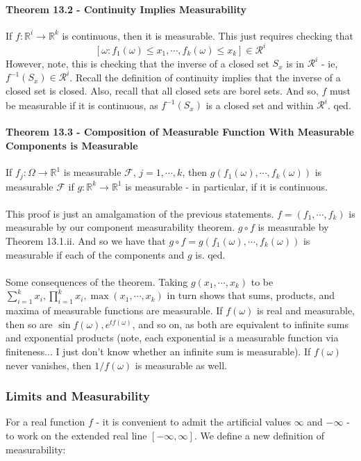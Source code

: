\documentclass[12pt,a4paper]{article}
\newcommand{\1}[1]{\mathbbm{1}\left\{ #1 \right\}}
\newcommand{\R}{\mathbb{R}}
\newcommand{\fcal}{\mathcal{F}}
\newcommand{\rcal}{\mathcal{R}}
\begin{document}
\paragraph{Theorem 13.2 - Continuity Implies Measurability} If $f: \R^i \to \R^k$ is continuous, then it is measurable. This just requires checking that
$$
	\left[\omega: f_1(\omega) \leq x_1, \cdots, f_k(\omega) \leq x_k\right] \in \rcal^i
$$
However, note, this is checking that the inverse of a closed set $S_x$ is in $\rcal^i$ - ie, $f^{-1}(S_x) \in \rcal^i$. Recall the definition of continuity implies that the inverse of a closed set is closed. Also, recall that all closed sets are borel sets. And so, $f$ must be measurable if it is continuous, as $f^{-1}(S_x)$ is a closed set and within $\rcal^i$. qed.

\paragraph{Theorem 13.3 - Composition of Measurable Function With Measurable Components is Measurable} If $f_j: \Omega \to \R^1$ is measurable $\fcal$, $j=1,\cdots,k$, then $g(f_1(\omega), \cdots, f_k(\omega))$ is measurable $\fcal$ if $g: \R^k \to \R^1$ is measurable - in particular, if it is continuous.
\\\\
This proof is just an amalgamation of the previous statements. $f = (f_1, \cdots, f_k)$ is measurable by our component measurability theorem. $g \circ f$ is measurable by Theorem 13.1.ii. And so we have that $g \circ f = g(f_1(\omega), \cdots, f_k(\omega))$ is measurable if each of the components and $g$ is. qed.
\\\\
Some consequences of the theorem. Taking $g(x_1, \cdots, x_k)$ to be $\sum_{i=1}^k x_i, \prod_{i=1}^k x_i, \max(x_1, \cdots, x_k)$ in turn shows that sums, products, and maxima of measurable functions are measurable. If $f(\omega)$ is real and measurable, then so are $\sin f(\omega), e^{tf(\omega)}$, and so on, as both are equivalent to infinite sums and exponential products (note, each exponential is a measurable function via finiteness... I just don't know whether an infinite sum is measurable). If $f(\omega)$ never vanishes, then $1/f(\omega)$ is measurable as well.

\subsubsection{Limits and Measurability} 
For a real function $f$ - it is convenient to admit the artificial values $\infty$ and $-\infty$ - to work on the extended real line $[-\infty,\infty]$. We define a new definition of measurability:
\end{document}
